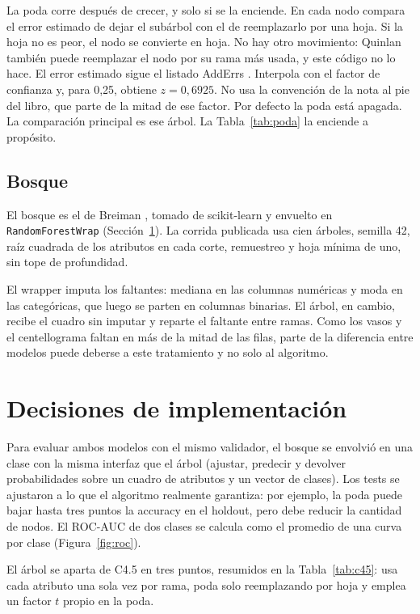 \documentclass{llncs}
\begin{document}
La poda corre después de crecer, y solo si se la enciende. En cada nodo compara el error estimado de dejar el subárbol con el de reemplazarlo por una hoja. Si la hoja no es peor, el nodo se convierte en hoja. No hay otro movimiento: Quinlan también puede reemplazar el nodo por su rama más usada, y este código no lo hace. El error estimado sigue el listado AddErrs \cite[pp.~278--279]{quinlan1993}. Interpola con el factor de confianza y, para 0,25, obtiene \(z = 0{,}6925\). No usa la convención de la nota al pie del libro, que parte de la mitad de ese factor. Por defecto la poda está apagada. La comparación principal es ese árbol. La Tabla~\ref{tab:poda} la enciende a propósito.

\subsection{Bosque}

El bosque es el de Breiman \cite{breiman2001}, tomado de scikit-learn \cite{pedregosa2011} y envuelto en \texttt{RandomForestWrap} (Sección~\ref{sec:solucion}). La corrida publicada usa cien árboles, semilla 42, raíz cuadrada de los atributos en cada corte, remuestreo y hoja mínima de uno, sin tope de profundidad.

El wrapper imputa los faltantes: mediana en las columnas numéricas y moda en las categóricas, que luego se parten en columnas binarias. El árbol, en cambio, recibe el cuadro sin imputar y reparte el faltante entre ramas. Como los vasos y el centellograma faltan en más de la mitad de las filas, parte de la diferencia entre modelos puede deberse a este tratamiento y no solo al algoritmo.

\section{Decisiones de implementación}
\label{sec:solucion}

Para evaluar ambos modelos con el mismo validador, el bosque se envolvió en una clase con la misma interfaz que el árbol (ajustar, predecir y devolver probabilidades sobre un cuadro de atributos y un vector de clases). Los tests se ajustaron a lo que el algoritmo realmente garantiza: por ejemplo, la poda puede bajar hasta tres puntos la accuracy en el holdout, pero debe reducir la cantidad de nodos. El ROC-AUC de dos clases se calcula como el promedio de una curva por clase (Figura~\ref{fig:roc}).

El árbol se aparta de C4.5 en tres puntos, resumidos en la Tabla~\ref{tab:c45}: usa cada atributo una sola vez por rama, poda solo reemplazando por hoja y emplea un factor \(t\) propio en la poda.
\end{document}
